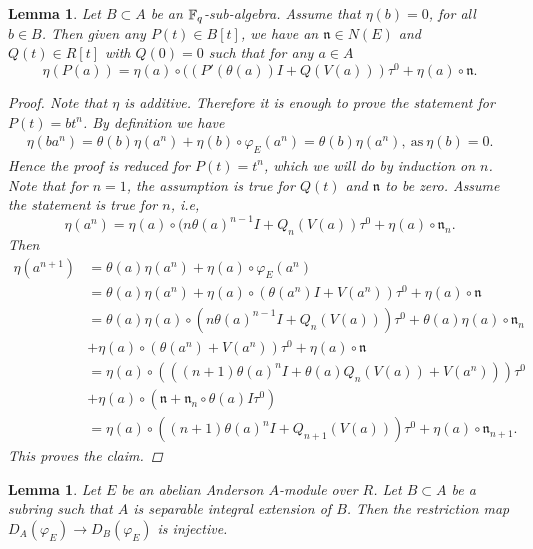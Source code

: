\documentclass{amsart}
\newtheorem {lemma}[theorem] {\bf Lemma}
\numberwithin {equation}{section}
\begin{document}
\begin{lemma}\label{bider-id} Let $B\subset A$ be an $\mathbb{F}_{q}$-sub-algebra. Assume that $\eta(b)=0$, for all $b\in B$. Then given any $P(t)\in B[t]$, we have an $\mathfrak{n}\in N(E)$ and $Q(t)\in R[t]$ with $Q(0)=0$ such that for any $a\in A$
$$\eta(P(a))= \eta(a)\circ((P'(\theta (a))I+Q(V(a)))\tau^{0}+\eta(a)\circ\mathfrak{n}.$$
\begin{proof}
Note that $\eta$ is additive. Therefore it is enough to prove the statement for $P(t)=bt^{n}$. By definition we have 
\begin{align*}
\eta(ba^{n})=\theta(b)\eta(a^n)+\eta(b)\circ\varphi_{E}(a^{n})= \theta(b)\eta(a^n),~\mathrm{as}~\eta(b)=0.
\end{align*}
Hence the proof is reduced for $P(t)=t^{n}$, which we will do by induction on $n$. Note that for $n=1$, the assumption is true for $Q(t)$ and $\mathfrak{n}$ to be zero. Assume the statement is true for $n$, i.e,
$$\eta(a^n)= \eta(a)\circ(n\theta (a)^{n-1}I+Q_{n}(V(a))\tau^{0}+\eta(a)\circ\mathfrak{n}_{n}.$$
Then 
\begin{align*}
\eta(a^{n+1})&=\theta(a)\eta(a^{n})+\eta(a)\circ\varphi_{E}(a^{n})\\
             &=\theta(a)\eta(a^{n})+\eta(a)\circ(\theta(a^n)I+V(a^{n}))\tau^{0}+ \eta(a)\circ\mathfrak{n}\\
            &=\theta(a)\eta(a)\circ(n\theta (a)^{n-1}I+Q_{n}(V(a)))\tau^{0}+\theta(a)\eta(a)\circ\mathfrak{n}_{n}\\
             &+\eta(a)\circ(\theta(a^n)+V(a^{n}))\tau^{0}+ \eta(a)\circ\mathfrak{n}\\
             &=\eta(a)\circ(((n+1)\theta(a)^{n}I+\theta(a)Q_{n}(V(a))+V(a^{n})))\tau^{0}\\
             &+\eta(a)\circ (\mathfrak{n}+\mathfrak{n}_{n}\circ \theta(a)I\tau^{0})\\
             &=\eta(a)\circ((n+1)\theta(a)^{n}I+Q_{n+1}(V(a)))\tau^{0}+\eta(a)\circ \mathfrak{n}_{n+1}.
\end{align*}
This proves the claim.
\end{proof}
\end{lemma}
\begin{lemma}\label{res-inj}  Let $E$ be an abelian Anderson $A$-module over $R$. Let $B\subset A$ be a subring such that $A$ is separable integral extension of $B$. Then the restriction map $D_{A}(\varphi_{E})\longrightarrow D_{B}(\varphi_{E})$ is injective. 
\end{lemma}
\end{document}
